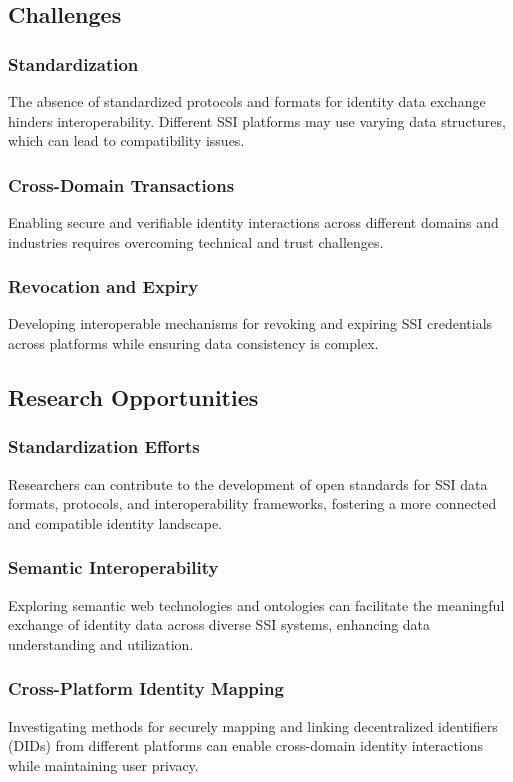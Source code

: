 \subsection*{Challenges}

\subsubsection*{Standardization} The absence of standardized protocols and formats for identity data exchange hinders interoperability. Different SSI platforms may use varying data structures, which can lead to compatibility issues.
\subsubsection*{Cross-Domain Transactions} Enabling secure and verifiable identity interactions across different domains and industries requires overcoming technical and trust challenges.
\subsubsection*{Revocation and Expiry} Developing interoperable mechanisms for revoking and expiring SSI credentials across platforms while ensuring data consistency is complex.

\subsection*{Research Opportunities}

\subsubsection*{Standardization Efforts} Researchers can contribute to the development of open standards for SSI data formats, protocols, and interoperability frameworks, fostering a more connected and compatible identity landscape.
\subsubsection*{Semantic Interoperability} Exploring semantic web technologies and ontologies can facilitate the meaningful exchange of identity data across diverse SSI systems, enhancing data understanding and utilization.
\subsubsection*{Cross-Platform Identity Mapping} Investigating methods for securely mapping and linking decentralized identifiers (DIDs) from different platforms can enable cross-domain identity interactions while maintaining user privacy.
